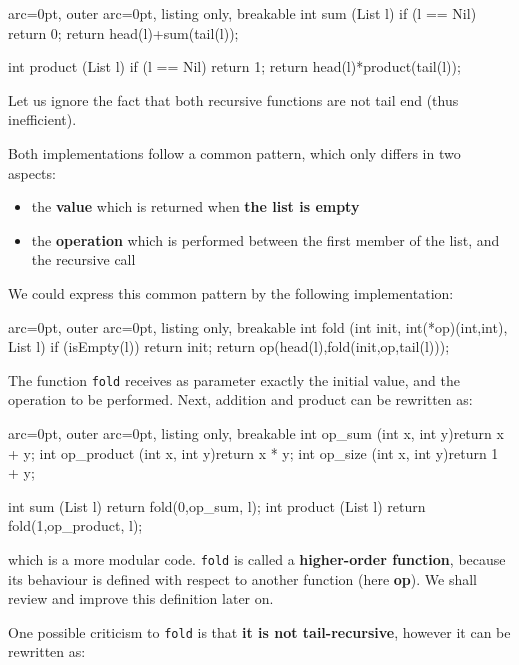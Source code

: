 \begin{tcblisting}{ arc=0pt, outer arc=0pt, listing only, breakable}
int sum (List l){
    if (l == Nil)
        return 0;
    return head(l)+sum(tail(l));
}

int product (List l){
    if (l == Nil)
        return 1;
    return head(l)*product(tail(l));
}

\end{tcblisting}


Let us ignore the fact that both recursive functions are not tail end (thus inefficient).

Both implementations follow a common pattern, which only differs in two aspects:
\begin{itemize}
	\item  the \textbf{value} which is returned when \textbf{the list is empty}
	\item  the \textbf{operation} which is performed between the first member of the list, and the recursive call
\end{itemize}

We could express this common pattern by the following implementation:


\begin{tcblisting}{ arc=0pt, outer arc=0pt, listing only, breakable}
int fold (int init, int(*op)(int,int), List l){
    if (isEmpty(l))
        return init;
    return op(head(l),fold(init,op,tail(l)));
}

\end{tcblisting}


The function \texttt{fold} receives as parameter exactly the initial value, and the operation to be performed. Next, addition and product can be rewritten as:


\begin{tcblisting}{ arc=0pt, outer arc=0pt, listing only, breakable}
int op_sum (int x, int y){return x + y;}
int op_product (int x, int y){return x * y;}
int op_size (int x, int y){return 1 + y;}

int sum (List l) {return fold(0,op_sum, l);}
int product (List l) {return fold(1,op_product, l);}

\end{tcblisting}


which is a more modular code. \texttt{fold} is called a \textbf{higher-order function}, because its behaviour is defined with respect to another function (here \textbf{op}). We shall review and improve this definition later on.

One possible criticism to \texttt{fold} is that \textbf{it is not tail-recursive}, however it can be rewritten as:


